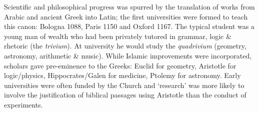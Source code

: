 
Scientific and philosophical progress was spurred by the translation of works from Arabic and ancient Greek into Latin; the first universities were formed to teach this canon: Bologna 1088, Paris 1150 and Oxford 1167. The typical student was a young man of wealth who had been privately tutored in grammar, logic \& rhetoric (the \emph{trivium}). At university he would study the \emph{quadrivium} (geometry, astronomy, arithmetic \& music). While Islamic improvements were incorporated, scholars gave pre-eminence to the Greeks: Euclid for geometry, Aristotle for logic/physics, Hippocrates/Galen for medicine, Ptolemy for astronomy. %
Early universities were often funded by the Church and `research' was more likely to involve the justification of biblical passages using Aristotle than the conduct of experiments.



